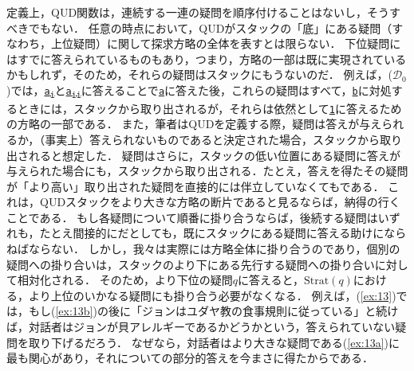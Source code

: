 \documentclass{goken}
\newcommand{\disref}[2]{\hyperref[#1]{\texttt{#2}}}
\newcommand{\disrefsub}[3]{\hyperref[#1]{\texttt{#2\textsubscript{#3}}}}
\begin{document}
定義上，QUD関数は，連続する一連の疑問を順序付けることはないし，そうすべきでもない．
任意の時点において，QUDがスタックの「底」にある疑問（すなわち，上位疑問）に関して探求方略の全体を表すとは限らない．
下位疑問にはすでに答えられているものもあり，つまり，方略の一部は既に実現されているかもしれず，そのため，それらの疑問はスタックにもうないのだ．
例えば，(\hyperref[D0]{$\mathcal{D}_0$})では，\disrefsub{D0:1ai}{a}{i}と\disrefsub{D0:1aii}{a}{ii}に答えることで\disref{D0:1a}{a}に答えた後，これらの疑問はすべて，\disref{D0:1b}{b}に対処するときには，スタックから取り出されるが，それらは依然として\disref{D0:1}{1}に答えるための方略の一部である．
また，筆者はQUDを定義する際，疑問は答えが与えられるか，（事実上）答えられないものであると決定された場合，スタックから取り出されると想定した．
疑問はさらに，スタックの低い位置にある疑問に答えが与えられた場合にも，スタックから取り出される．たとえ，答えを得たその疑問が「より高い」取り出された疑問を直接的には伴立していなくてもである．
これは，QUDスタックをより大きな方略の断片であると見るならば，納得の行くことである．
もし各疑問について順番に掛り合うならば，後続する疑問はいずれも，たとえ間接的にだとしても，既にスタックにある疑問に答える助けにならねばならない．
しかし，我々は実際には方略全体に掛り合うのであり，個別の疑問への掛り合いは，スタックのより下にある先行する疑問への掛り合いに対して相対化される．
そのため，より下位の疑問$q$に答えると，$\text{Strat}(q)$における，より上位のいかなる疑問にも掛り合う必要がなくなる．
例えば，(\ref{ex:13})では，もし(\ref{ex:13b})の後に「ジョンはユダヤ教の食事規則に従っている」と続けば，対話者はジョンが貝アレルギーであるかどうかという，答えられていない疑問を取り下げるだろう．
なぜなら，対話者はより大きな疑問である(\ref{ex:13a})に最も関心があり，それについての部分的答えを今まさに得たからである．
\end{document}

